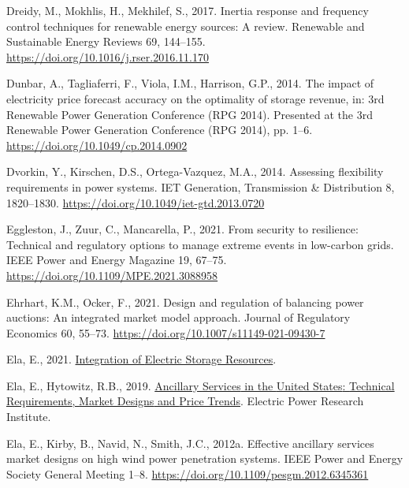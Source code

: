 \documentclass[12pt,a4paper,]{report}
\newlength{\cslhangindent}
\newenvironment{CSLReferences}[2] %
 {%
  \setlength{\parindent}{0pt}
  \ifodd #1 \everypar{\setlength{\hangindent}{\cslhangindent}}\ignorespaces\fi
  \ifnum #2 > 0
  \setlength{\parskip}{#2\baselineskip}
  \fi
 }%
 {}
\begin{document}
\begin{CSLReferences}{1}{0}
\leavevmode{}%
Dreidy, M., Mokhlis, H., Mekhilef, S., 2017. Inertia response and
frequency control techniques for renewable energy sources: {A} review.
Renewable and Sustainable Energy Reviews 69, 144--155.
\url{https://doi.org/10.1016/j.rser.2016.11.170}

\leavevmode{}%
Dunbar, A., Tagliaferri, F., Viola, I.M., Harrison, G.P., 2014. The
impact of electricity price forecast accuracy on the optimality of
storage revenue, in: 3rd {Renewable Power Generation Conference} ({RPG}
2014). Presented at the 3rd {Renewable Power Generation Conference}
({RPG} 2014), pp. 1--6. \url{https://doi.org/10.1049/cp.2014.0902}

\leavevmode{}%
Dvorkin, Y., Kirschen, D.S., Ortega-Vazquez, M.A., 2014. Assessing
flexibility requirements in power systems. IET Generation, Transmission
\& Distribution 8, 1820--1830.
\url{https://doi.org/10.1049/iet-gtd.2013.0720}

\leavevmode{}%
Eggleston, J., Zuur, C., Mancarella, P., 2021. From security to
resilience: {Technical} and regulatory options to manage extreme events
in low-carbon grids. IEEE Power and Energy Magazine 19, 67--75.
\url{https://doi.org/10.1109/MPE.2021.3088958}

\leavevmode{}%
Ehrhart, K.M., Ocker, F., 2021. Design and regulation of balancing power
auctions: An integrated market model approach. Journal of Regulatory
Economics 60, 55--73. \url{https://doi.org/10.1007/s11149-021-09430-7}

\leavevmode{}%
Ela, E., 2021.
\href{https://www.energy.gov/sites/prod/files/2021/02/f82/Energy\%20Storage_Ela_EPRI_0.pdf}{Integration
of {Electric Storage Resources}}.

\leavevmode{}%
Ela, E., Hytowitz, R.B., 2019.
\href{https://www.epri.com/research/products/000000003002015670}{Ancillary
{Services} in the {United States}: {Technical Requirements}, {Market
Designs} and {Price Trends}}. {Electric Power Research Institute}.

\leavevmode{}%
Ela, E., Kirby, B., Navid, N., Smith, J.C., 2012a. Effective ancillary
services market designs on high wind power penetration systems. IEEE
Power and Energy Society General Meeting 1--8.
\url{https://doi.org/10.1109/pesgm.2012.6345361}


\end{CSLReferences}
\end{document}
